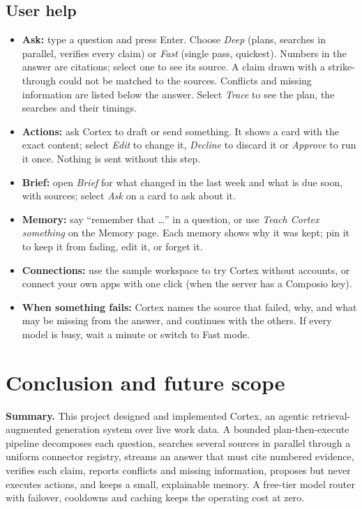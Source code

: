 \documentclass[oneside,a4paper,12pt]{report}
\begin{document}
     \section{User help}
\begin{itemize}
\item \textbf{Ask:} type a question and press Enter. Choose \emph{Deep} (plans, searches in parallel, verifies every claim) or \emph{Fast} (single pass, quickest). Numbers in the answer are citations; select one to see its source. A claim drawn with a strike-through could not be matched to the sources. Conflicts and missing information are listed below the answer. Select \emph{Trace} to see the plan, the searches and their timings.
\item \textbf{Actions:} ask Cortex to draft or send something. It shows a card with the exact content; select \emph{Edit} to change it, \emph{Decline} to discard it or \emph{Approve} to run it once. Nothing is sent without this step.
\item \textbf{Brief:} open \emph{Brief} for what changed in the last week and what is due soon, with sources; select \emph{Ask} on a card to ask about it.
\item \textbf{Memory:} say ``remember that \ldots'' in a question, or use \emph{Teach Cortex something} on the Memory page. Each memory shows why it was kept; pin it to keep it from fading, edit it, or forget it.
\item \textbf{Connections:} use the sample workspace to try Cortex without accounts, or connect your own apps with one click (when the server has a Composio key).
\item \textbf{When something fails:} Cortex names the source that failed, why, and what may be missing from the answer, and continues with the others. If every model is busy, wait a minute or switch to Fast mode.
\end{itemize}

 \chapter{Conclusion and future scope}
\textbf{Summary.} This project designed and implemented Cortex, an agentic retrieval-augmented generation system over live work data. A bounded plan-then-execute pipeline decomposes each question, searches several sources in parallel through a uniform connector registry, streams an answer that must cite numbered evidence, verifies each claim, reports conflicts and missing information, proposes but never executes actions, and keeps a small, explainable memory. A free-tier model router with failover, cooldowns and caching keeps the operating cost at zero.
\end{document}

